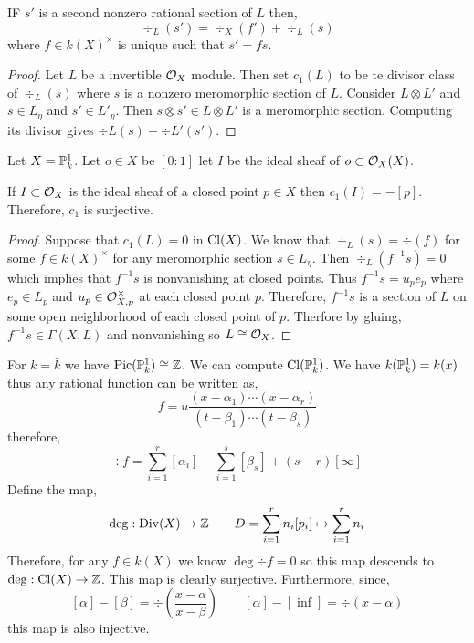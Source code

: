 \documentclass[12pt]{article}
\begin{document}
\begin{lemma}
IF $s'$ is a second nonzero rational section of $L$ then,
\[ \div_L(s') = \div_X(f') + \div_L(s) \]
where $f \in k(X)^\times$ is unique such that $s' = f s$. 
\end{lemma}

\begin{proof}
Let $L$ be a invertible $\struct{X}$ module. Then set $c_1(L)$ to be te divisor class of $\div_L(s)$ where $s$ is a nonzero meromorphic section of $L$. Consider $L \otimes L'$ and $s \in L_\eta$ and $s' \in L'_{\eta}$. Then $s \otimes s' \in L \otimes L'$ is a meromorphic section. Computing its divisor gives $\div{L}(s) + \div{L'}(s')$. 
\end{proof}



\begin{example}
Let $X = \P^1_k$. Let $o \in X$ be $[0 : 1]$ let $I$ be the ideal sheaf of $o \subset \struct{X}(X)$. 
\end{example}

\begin{lemma}
If $I \subset \struct{X}$ is the ideal sheaf of a closed point $p \in X$ then $c_1(I) = - [p]$. Therefore, $c_1$ is surjective. 
\end{lemma}

\begin{lemma}

\end{lemma}

\begin{proof}
Suppose that $c_1(L) = 0$ in $\Cl{X}$. We know that $\div_L(s) = \div(f)$ for some $f \in k(X)^\times$ for any meromorphic section $s \in L_\eta$. Then $\div_L(f^{-1} s) = 0$ which implies that $f^{-1} s$ is nonvanishing at closed points. Thus $f^{-1} s = u_p e_p$ where $e_p \in L_p$ and $u_p \in \stalk{X}{p}^\times$ at each closed point $p$. Therefore, $f^{-1} s$ is a section of $L$ on some open neighborhood of each closed point of $p$. Therfore by gluing, $f^{-1} s \in \Gamma(X, L)$ and nonvanishing so $L \cong \struct{X}$. 
\end{proof}

\begin{example}
For $k = \bar{k}$ we have $\Pic{\P^1_k} \cong \Z$. We can compute $\Cl{\P_k^1}$. We have $k(\P^1_k) = k(x)$ thus any rational function can be written as,
\[ f = u \frac{(x - \alpha_1) \cdots (x - \alpha_r)}{(t - \beta_1) \cdots (t - \beta_s)} \]
therefore,
\[ \div{f} = \sum_{i = 1}^r [\alpha_i] - \sum_{i = 1}^s [\beta_s] + (s - r) [\infty] \]
Define the map,
\[ \deg : \Div{X} \to \Z \quad \quad D = \sum_{i = 1}^r n_i [p_i] \mapsto \sum_{i = 1}^r n_i \]
Therefore, for any $f \in k(X)$ we know $\deg{\div{f}} = 0$ so this map descends to $\deg : \Cl{X} \to \Z$. This map is clearly surjective. Furthermore, since,
\[ [\alpha] - [\beta] = \div{\left( \frac{x - \alpha}{x - \beta} \right)} \quad \quad [\alpha] - [\inf] = \div{(x - \alpha)} \]
this map is also injective. 
\end{example}
\end{document}
